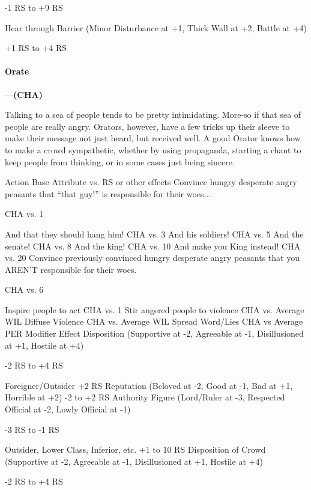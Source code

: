 \documentclass[oneside,11pt,english]{book}
\begin{document}
-1 RS to +9 RS 

Hear through Barrier (Minor Disturbance at +1, Thick Wall at +2, Battle at 
+4) 

+1 RS to +4 RS 

 

 

\paragraph{\label{skill:Orate}Orate}---\quad\textbf{(CHA)}\par
Talking to a sea of people tends to be pretty intimidating. More-so if that sea of people are really angry. Orators, however, have a few tricks up their sleeve to make their message not just heard, but received well. A good Orator knows how to make a crowd sympathetic, whether by using propaganda, starting a chant to keep people from thinking, or in some cases just being sincere.


Action Base Attribute vs. RS or 
other effects 
Convince hungry desperate angry peasants that “that guy!” is responsible 
for their woes... 

CHA vs. 1 

And that they should hang him! CHA vs. 3 
And his soldiers! CHA vs. 5 
And the senate! CHA vs. 8 
And the king! CHA vs. 10 
And make you King instead! CHA vs. 20 
Convince previously convinced hungry desperate angry peasants that you 
AREN’T responsible for their woes. 

CHA vs. 6 

Inspire people to act CHA vs. 1 
Stir angered people to violence CHA vs. Average WIL 
Diffuse Violence CHA vs. Average WIL 
Spread Word/Lies CHA vs Average PER 
Modifier Effect 
Disposition (Supportive at -2, Agreeable at -1, Disillusioned at +1, Hostile at +4)

-2 RS to +4 RS 

Foreigner/Outsider +2 RS 
Reputation (Beloved at -2, Good at -1, Bad at +1, Horrible at +2) -2 to +2 RS 
Authority Figure (Lord/Ruler at -3, Respected Official at -2, Lowly 
Official at -1) 

-3 RS to -1 RS 

Outsider, Lower Class, Inferior, etc. +1 to 10 RS 
Disposition of Crowd (Supportive at -2, Agreeable at -1, Disillusioned at 
+1, Hostile at +4) 

-2 RS to +4 RS 

 

 
\end{document}
